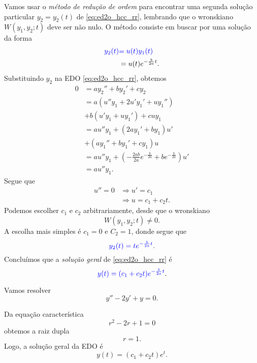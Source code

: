 Vamos usar o \emph{método de redução de ordem} para encontrar uma segunda solução particular $y_2 = y_2(t)$ de \eqref{eq:ed2o_hcc_rr}, lembrando que o wronskiano $W(y_1,y_2; t)$ deve ser não nulo. O método consiste em buscar por uma solução da forma
\begin{align}
  {\color{blue}y_2(t)} &{\color{blue}= u(t)y_1(t)} \\
                      &= u(t)e^{-\frac{b}{2a}t}.
\end{align}
Substituindo $y_2$ na EDO \eqref{eq:ed2o_hcc_rr}, obtemos
\begin{align}
  0 &= ay_2'' + by_2' + cy_2 \\
    &= a(u''y_1 + 2u'y_1' + uy_1'') \\
    &+ b(u'y_1 + uy_1') + cuy_1 \\
    &= au''y_1 + (2ay_1' + by_1)u' \\
    &+ (ay_1'' + by_1' + cy_1)u \\
    &= au''y_1 + \left(-\frac{2ab}{2a}e^{-\frac{b}{2a}} + be^{-\frac{b}{2a}}\right)u' \\
    &= au''y_1.
\end{align}
Segue que
\begin{align}
  u'' = 0  &\Rightarrow u' = c_1 \\
           &\Rightarrow u = c_1 + c_2t.
\end{align}
Podemos escolher $c_1$ e $c_2$ arbitrariamente, desde que o wronskiano
\begin{equation}
  W(y_1,y_2;t) \neq 0.
\end{equation}
A escolha mais simples é $c_1 = 0$ e $C_2 = 1$, donde segue que
\begin{equation}
  {\color{blue}y_2(t) = te^{-\frac{b}{2a}t}}.
\end{equation}
Concluímos que a \emph{solução geral} de \eqref{eq:ed2o_hcc_rr} é
\begin{equation}
  {\color{blue}y(t) = (c_1 + c_2t)e^{-\frac{b}{2a}t}}.
\end{equation}

\begin{ex}
  Vamos resolver
  \begin{equation}
    y'' -2y' + y = 0.
  \end{equation}

  Da equação característica
  \begin{equation}
    r^2 - 2r + 1 = 0
  \end{equation}
  obtemos a raiz dupla
  \begin{equation}
    r = 1.
  \end{equation}
  Logo, a solução geral da EDO é
  \begin{equation}
    y(t) = (c_1 + c_2t)e^{t}.
  \end{equation}
\end{ex}

